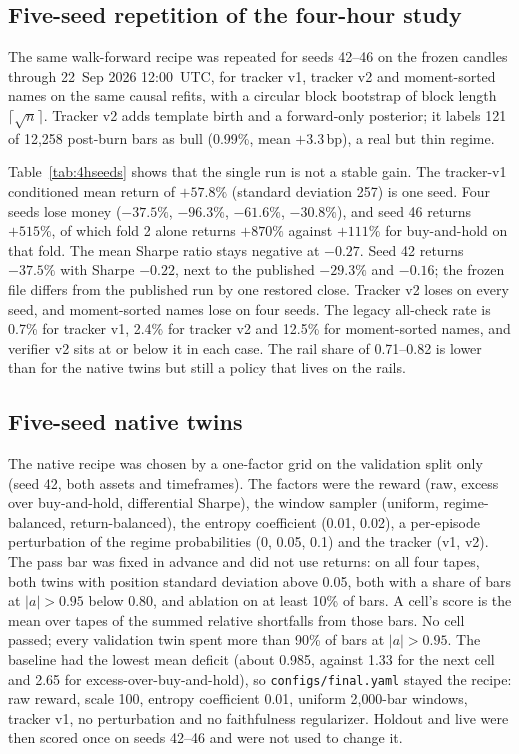 \documentclass[conference]{IEEEtran}
\begin{document}
\subsection{Five-seed repetition of the four-hour study}
\label{sec:fourhseeds}
The same walk-forward recipe was repeated for seeds 42--46 on the frozen candles through 22~Sep 2026 12:00~UTC, for tracker v1, tracker v2 and moment-sorted names on the same causal refits, with a circular block bootstrap of block length $\lceil\sqrt{n}\rceil$. Tracker v2 adds template birth and a forward-only posterior; it labels 121 of 12{,}258 post-burn bars as bull (0.99\%, mean $+3.3$\,bp), a real but thin regime.

Table~\ref{tab:4hseeds} shows that the single run is not a stable gain. The tracker-v1 conditioned mean return of $+57.8\%$ (standard deviation 257) is one seed. Four seeds lose money ($-37.5\%$, $-96.3\%$, $-61.6\%$, $-30.8\%$), and seed 46 returns $+515\%$, of which fold 2 alone returns $+870\%$ against $+111\%$ for buy-and-hold on that fold. The mean Sharpe ratio stays negative at $-0.27$. Seed 42 returns $-37.5\%$ with Sharpe $-0.22$, next to the published $-29.3\%$ and $-0.16$; the frozen file differs from the published run by one restored close. Tracker v2 loses on every seed, and moment-sorted names lose on four seeds. The legacy all-check rate is 0.7\% for tracker v1, 2.4\% for tracker v2 and 12.5\% for moment-sorted names, and verifier v2 sits at or below it in each case. The rail share of 0.71--0.82 is lower than for the native twins but still a policy that lives on the rails.

\subsection{Five-seed native twins}
\label{sec:native}
The native recipe was chosen by a one-factor grid on the validation split only (seed 42, both assets and timeframes). The factors were the reward (raw, excess over buy-and-hold, differential Sharpe), the window sampler (uniform, regime-balanced, return-balanced), the entropy coefficient (0.01, 0.02), a per-episode perturbation of the regime probabilities (0, 0.05, 0.1) and the tracker (v1, v2). The pass bar was fixed in advance and did not use returns: on all four tapes, both twins with position standard deviation above 0.05, both with a share of bars at $|a|>0.95$ below 0.80, and ablation on at least 10\% of bars. A cell's score is the mean over tapes of the summed relative shortfalls from those bars. No cell passed; every validation twin spent more than 90\% of bars at $|a|>0.95$. The baseline had the lowest mean deficit (about 0.985, against 1.33 for the next cell and 2.65 for excess-over-buy-and-hold), so \texttt{configs/final.yaml} stayed the recipe: raw reward, scale 100, entropy coefficient 0.01, uniform 2{,}000-bar windows, tracker v1, no perturbation and no faithfulness regularizer. Holdout and live were then scored once on seeds 42--46 and were not used to change it.
\end{document}
